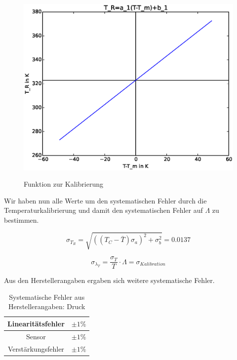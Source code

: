 \documentclass[12pt,a4paper]{article}
\begin{document}
\begin{figure}[H]
\centering
\includegraphics[scale=0.5]{Bilder/gewollteFunktion.eps}
\\
\caption{Funktion zur Kalibrierung}
\end{figure}


Wir haben nun alle Werte um den systematischen Fehler durch die Temperaturkalibrierung und damit den systematischen Fehler auf $\Lambda$ zu bestimmen.

\begin{equation}
\sigma_{T_{R}} = \sqrt{((T_C-\bar{T}) \sigma_a)^2+\sigma_b^2}=0.0137
\end{equation}

\begin{equation}
\sigma_{\lambda_{T}}=\frac{\sigma_T}{T}\cdot \Lambda= \sigma_{Kalibration}
\end{equation}

Aus den Herstellerangaben ergaben sich weitere systematische Fehler.

\begin{table}[H]\centering
\caption{Systematische Fehler aus Herstellerangaben: Druck}
\begin{tabular}{|c|c|}
\hline 
Linearitätsfehler & $\pm 1\%$ \\ 
\hline 
Sensor & $\pm 1\%$ \\ 
\hline 
Verstärkungsfehler & $\pm 1\%$ \\ 
\hline 
\end{tabular} 
\end{table}
\end{document}
